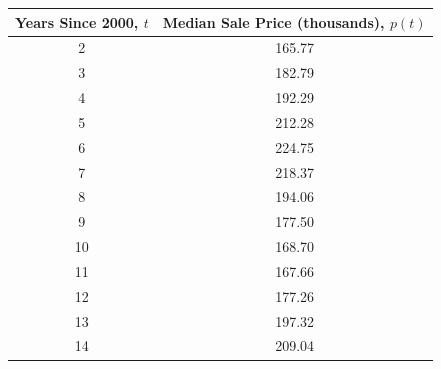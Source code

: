 \documentclass[12pt]{letter}
\newcommand{\?}{\stackrel{?}{=}}
\begin{document}
	\begin{tabular}{c|c}
		 Years Since 2000, $t$ & Median Sale Price (thousands), $p(t)$ \\ \hline
		 2 & 165.77 \\
		 3 & 182.79 \\
		 4 & 192.29 \\
		 5 & 212.28 \\
		 6 & 224.75 \\
		 7 & 218.37 \\
		 8 & 194.06 \\
		 9 & 177.50 \\
		 10 & 168.70 \\
		 11 & 167.66 \\
		 12 & 177.26 \\
		 13 & 197.32 \\
		 14 & 209.04 \\
	\end{tabular}
	
	
	
\end{document}
